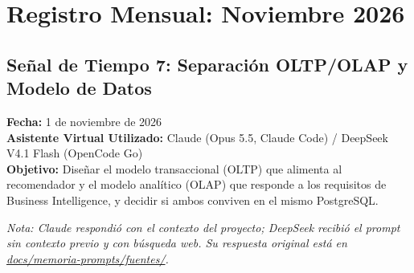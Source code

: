 \section{Registro Mensual: Noviembre 2026}

\subsection{Señal de Tiempo 7: Separación OLTP/OLAP y Modelo de Datos}
\textbf{Fecha:} 1 de noviembre de 2026 \\
\textbf{Asistente Virtual Utilizado:} Claude (Opus 5.5, Claude Code) / DeepSeek V4.1 Flash (OpenCode Go) \\
\textbf{Objetivo:} Diseñar el modelo transaccional (OLTP) que alimenta al recomendador y el modelo analítico (OLAP) que responde a los requisitos de Business Intelligence, y decidir si ambos conviven en el mismo PostgreSQL.

\textit{Nota: Claude respondió con el contexto del proyecto; DeepSeek recibió el prompt sin contexto previo y con búsqueda web. Su respuesta original está en \url{docs/memoria-prompts/fuentes/}.}

